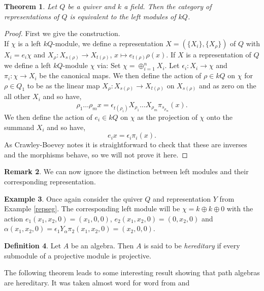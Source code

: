 \documentclass[11.5pt, twoside, a4paper, titlepage]{report}
\theoremstyle{definition}
\newtheorem{mydef}{Definition}[section]
\newtheorem{rem}[mydef]{Remark}
\newtheorem{eg}[mydef]{Example}
\theoremstyle{plain}
\newtheorem{thm}[mydef]{Theorem}
\begin{document}
\begin{thm}
Let $Q$ be a quiver and $k$ a field. Then the category of representations of $Q$ is equivalent to the left modules of $kQ$.
\end{thm}
\begin{proof}
First we give the construction. \\
If $\chi$ is a left $kQ$-module, we define a representation $X=(\{X_i\},\{X_{\rho}\})$ of $Q$ with $X_i=e_i\chi$ and $X_{\rho}: X_{s(\rho)} \to X_{t(\rho)}$, $ x \mapsto e_{t(\rho)}\rho(x)$.  If $X$ is a representation of $Q$ we define a left $kQ$-module $\chi$ via: Set $\chi=\oplus^n_{i=1}X_i$. Let $\epsilon_i: X_i \to \chi$ and $\pi_i: \chi \to X_i$ be the canonical maps. We then define the action of $\rho \in kQ$ on $\chi$ for $\rho \in Q_1$ to be as the linear map $X_{\rho}: X_{s(\rho)} \to X_{t(\rho)}$ on $X_{s(\rho)}$ and as zero on the all other $X_i$ and so have,
\begin{equation*}
\rho_1\dots\rho_mx= \epsilon_{t(\rho_i)}X_{\rho_1}  \dots X_{\rho_m}\pi_{s_{\rho_m}}(x).
\end{equation*}
We then define the action of $e_i \in kQ$ on $\chi$ as the projection of $\chi$ onto the summand $X_i$ and so have,
\begin{equation*}
e_ix=\epsilon_i\pi_i(x).
\end{equation*}
As Crawley-Boevey notes it is straightforward to check that these are inverses and the morphisms behave, so we will not prove it here.
\end{proof}

\begin{rem}
We can now ignore the distinction between left modules and their corresponding representation.
\end{rem}

\begin{eg}
Once again consider the quiver $Q$ and representation $Y$ from Example \ref{repseg}. The corresponding left module will be $\chi = k \oplus k \oplus 0$ with the action $e_1(x_1,x_2,0)=(x_1,0,0)$, $e_2(x_1,x_2,0)=(0,x_2,0)$ and $\alpha(x_1,x_2,0)=\epsilon_1Y_{\alpha}\pi_2(x_1,x_2,0)=(x_2,0,0)$.
\end{eg}

\begin{mydef}
Let $A$ be an algebra. Then $A$ is said to be \emph{hereditary} if every submodule of a projective module is projective.
\end{mydef}

The following theorem leads to some interesting result showing that path algebras are hereditary. It was taken almost word for word from \cite{CB2} and \cite{Vale}
\end{document}
